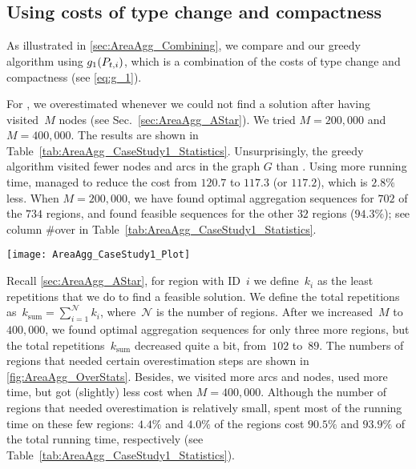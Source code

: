 \subsection{Using costs of type change and compactness}
As illustrated in \sect\ref{sec:AreaAgg_Combining},
we compare \Astar and our greedy algorithm using $g_1(P_{t,i})$,
which is a combination of the costs 
of type change and compactness (see \eq\ref{eq:g_1}).

For \Astar, we overestimated 
whenever we could not find a solution after 
having visited~$M$ nodes (see 
Sec.~\ref{sec:AreaAgg_AStar}).
We tried $M=200{,}000$ and $M=400{,}000$. 
The results are shown in Table~\ref{tab:AreaAgg_CaseStudy1_Statistics}.
%
Unsurprisingly, the greedy algorithm visited fewer nodes and 
arcs in the graph $G$ than \Astar.
Using more running time, 
\Astar managed to reduce the cost 
from $120.7$ to $117.3$ (or $117.2$), 
which is $2.8\%$ less.
%
When $M=200{,}000$, 
we have found optimal aggregation sequences for 
$702$ of the $734$ regions, 
and found feasible sequences 
for the other $32$ regions ($94.3\%$); 
see column \#over in Table~\ref{tab:AreaAgg_CaseStudy1_Statistics}.
\begin{table*}[tb]
	\centering
	\caption{A comparison of Greedy and \Astar		
			when using cost function~$g_1$.
			For \Astar, we used two settings, 
			i.e.,~$M=200{,}000$ and~$M=400{,}000$.
		Symbol~\#over is the number and percentage of regions
		(out of 734) that needed overestimation.
		Variable~$k_\mathrm{sum}$ is the total repetitions.
		Symbols~\#nodes and~\#arcs are the total 
		numbers of nodes and arcs that \Astar visited.  
		(For instances where we needed overestimation, 
		only the final attempt was counted.)
		Symbols $g_\mathrm{t}$, $g_\mathrm{c}$, and $g_1$
		denote the sums of $g_\mathrm{type}(\Pgoal)$,
		$g_\mathrm{comp}(\Pgoal)$, and $g_1(\Pgoal)$,
		respectively, over all instances (see 
		\eqs\ref{eq:g_type}, \ref{eq:g_comp}, 
		and~\ref{eq:g_1}).
		The percentage in the
		time column is the fraction of the total
		runtime spent on solving the instances
		that needed overestimation.
	}
	\label{tab:AreaAgg_CaseStudy1_Statistics}
	\texttt{[image: AreaAgg\_CaseStudy1\_Plot]} 
\end{table*}

Recall \sect\ref{sec:AreaAgg_AStar}, for region with 
ID~$i$ we 
define~$k_i$ as the least repetitions that we do to find a 
feasible solution. 
We define the total repetitions 
as~$k_\mathrm{sum}=\sum_{i=1}^\mathcal{N} k_i$, 
where~$\mathcal{N}$ is the number of regions.
After we increased~$M$ to~$400{,}000$, we found optimal 
aggregation sequences for only three more regions, 
but the total repetitions~$k_\mathrm{sum}$ decreased 
quite a bit, from~$102$ to~$89$. 
The numbers of regions that needed certain
overestimation steps are shown in 
\fig\ref{fig:AreaAgg_OverStats}. 
Besides, we visited more arcs and nodes, 
used more time, 
but got (slightly) less cost when $M=400{,}000$.
Although the number of regions 
that needed overestimation is relatively small, 
\Astar spent most of the running time 
on these few regions: $4.4\%$ and $4.0\%$ of the regions 
cost $90.5\%$ and $93.9\%$ of the total running time, 
respectively (see Table~\ref{tab:AreaAgg_CaseStudy1_Statistics}).

